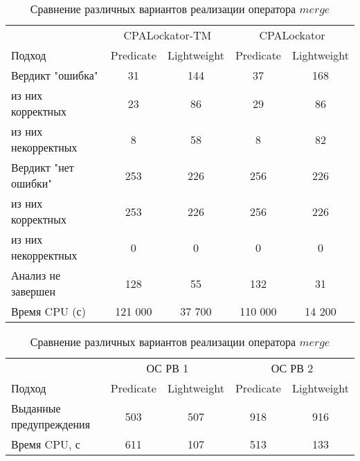 \begin{center}
  \begin{table}[h]\footnotesize \centering
  	\label{table-drivers-lock-refinement}
    \caption{Сравнение различных вариантов реализации оператора $merge$}
    \begin{tabular}{ | l | c | c | c | c |}
      \hline
      & 			 \multicolumn{2}{|c|}{CPALockator-TM} & 	\multicolumn{2}{|c|}{CPALockator}\\
      Подход         				& Predicate & Lightweight 	& Predicate & Lightweight\\ \hline
      Вердикт "ошибка" 				& 31   		& 144   	& 37   		& 168  	\\ 
  \hspace{0.5cm} из них корректных 	& 23 		& 86 		& 29   		& 86 	\\ 
  \hspace{0.5cm} из них некорректных & 8 		& 58 		& 8   		& 82 	\\ \hline
      Вердикт "нет ошибки"  		& 253    	& 226    	& 256   	& 226 	\\ 
  \hspace{0.5cm} из них корректных 	& 253 		& 226    	& 256   	& 226 	\\
  \hspace{0.5cm} из них некорректных & 0 		& 0    		& 0   		& 0 	\\ \hline
      Анализ не завершен       		& 128    	& 55    	& 132   	& 31  	\\ \hline
      Время CPU (с)   				& 121 000 	& 37 700 	& 110 000  	& 14 200\\ 
      \hline
    \end{tabular}
  \end{table}
\end{center}


\begin{center}
  \begin{table}[h] \footnotesize \centering
  	\label{table-drivers-lock-refinement}
    \caption{Сравнение различных вариантов реализации оператора $merge$}
    \begin{tabular}{ | l | c | c | c | c |  }
      \hline
      		& 			 \multicolumn{2}{|c|}{ОС РВ 1} & 	\multicolumn{2}{|c|}{ОС РВ 2}\\
      Подход         					& Predicate  & Lightweight 	& Predicate  & Lightweight 	\\ \hline
      Выданные предупреждения			& 503   	& 507    		& 918   	& 916  			\\ 
  	  Время CPU, с 						& 611   	& 107  			& 513   	& 133  		\\ 
      \hline
    \end{tabular}
  \end{table}
\end{center}

